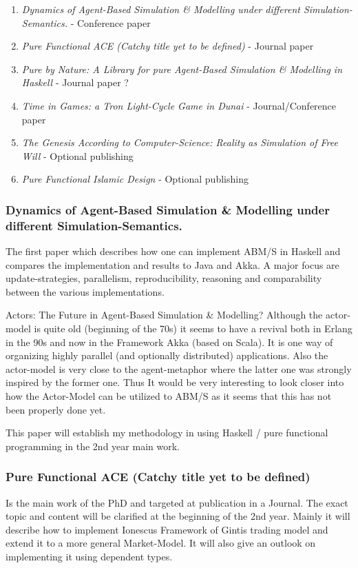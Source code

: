 \begin{enumerate}
\item \textit{Dynamics of Agent-Based Simulation \& Modelling under different Simulation-Semantics.} - Conference paper
\item \textit{Pure Functional ACE (Catchy title yet to be defined)} - Journal paper
\item \textit{Pure by Nature: A Library for pure Agent-Based Simulation \& Modelling in Haskell} - Journal paper ?
\item \textit{Time in Games: a Tron Light-Cycle Game in Dunai} - Journal/Conference paper
\item \textit{The Genesis According to Computer-Science: Reality as Simulation of Free Will} - Optional publishing
\item \textit{Pure Functional Islamic Design} - Optional publishing
\end{enumerate}

\subsubsection{Dynamics of Agent-Based Simulation \& Modelling under different Simulation-Semantics.}
The first paper which describes how one can implement ABM/S in Haskell and compares the implementation and results to Java and Akka. A major focus are update-strategies, parallelism, reproducibility, reasoning and comparability between the various implementations. 

Actors: The Future in Agent-Based Simulation \& Modelling?
Although the actor-model is quite old (beginning of the 70s) it seems to have a revival both in Erlang in the 90s and now in the Framework Akka (based on Scala). It is one way of organizing highly parallel (and optionally distributed) applications. Also the actor-model is very close to the agent-metaphor where the latter one was strongly inspired by the former one. Thus It would be very interesting to look closer into how the Actor-Model can be utilized to ABM/S as it seems that this has not been properly done yet.

This paper will establish my methodology in using Haskell / pure functional programming in the 2nd year main work.

\subsubsection{Pure Functional ACE (Catchy title yet to be defined)}
Is the main work of the PhD and targeted at publication in a Journal. The exact topic and content will be clarified at the beginning of the 2nd year. Mainly it will describe how to implement Ionescus Framework of Gintis trading model and extend it to a more general Market-Model. It will also give an outlook on implementing it using dependent types.

